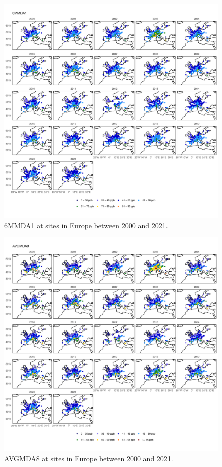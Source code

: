 \documentclass{article}
\begin{document}
\begin{figure}
\centering
\includegraphics[height=0.9\textheight]{figures/si_figures/fS14_metric_map_Europe_6MMDA1.pdf}
\caption{6MMDA1 at sites in Europe between 2000 and 2021.}
\label{si_fig:metric_map_eu_6MMDA1}
\end{figure}
\clearpage

\begin{figure}
\centering
\includegraphics[height=0.9\textheight]{figures/si_figures/fS15_metric_map_Europe_AVGMDA8.pdf}
\caption{AVGMDA8 at sites in Europe between 2000 and 2021.}
\label{si_fig:metric_map_eu_AVGMDA8}
\end{figure}
\clearpage
\end{document}
